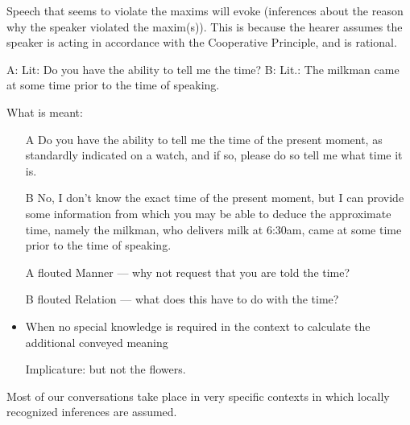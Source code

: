 \documentclass[headrule,footrule]{foils}
\begin{document}

Speech that seems to violate the maxims will evoke 
(inferences about the reason why the speaker violated the maxim(s)).
This is because the hearer assumes the speaker is acting in accordance
with the Cooperative Principle, and is rational.
\begin{exe}
  \ex A: 
  \trans Lit: Do you have the ability to tell me the time?
  \ex B: 
  \trans Lit.: The milkman came at some time prior to the time of speaking.
\end{exe}
\newpage
What is meant:
\begin{itemize}
\item [A] Do you have the ability to tell me the time of the present moment, as standardly indicated on a watch, and if so, please do so tell me what time it is.
\item [B] No, I don’t know the exact time of the present moment, but I can provide some information from which you may be able to deduce the approximate time, namely the milkman, who delivers milk at 6:30am,  came at some time prior to the time of speaking.
\end{itemize}

\begin{itemize}
\item [A] flouted Manner --- why not request that you are told the time?
\item [B] flouted Relation --- what does this have to do with the time?
\end{itemize}

\begin{itemize}
\item When no special knowledge is required in the context to calculate the additional conveyed meaning
  \begin{exe}
    \ex {}
    \ex {}
    \trans \textnormal{Implicature: but not the flowers.}
  \end{exe}  
\end{itemize}



Most of our conversations take place in very specific contexts in
which locally recognized inferences are assumed.

\begin{exe}
  \ex {}
  \ex {}
\end{exe}
\end{document}

